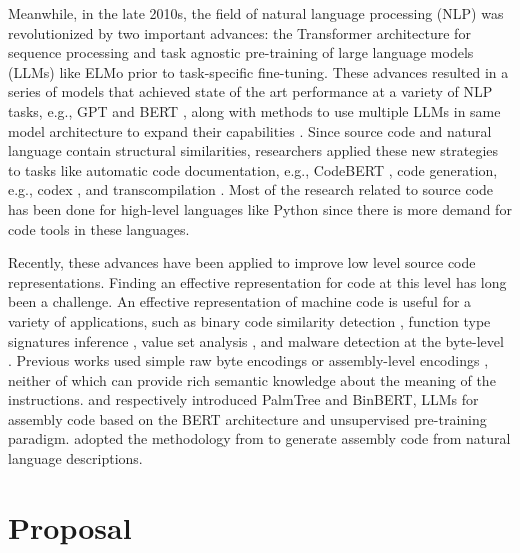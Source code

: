 \documentclass[conference]{IEEEtran}
\begin{document}
Meanwhile, in the late 2010s, the field of natural language processing (NLP) was revolutionized by two important advances: the Transformer architecture for sequence processing \cite{vaswani2017attention} and task agnostic pre-training of large language models (LLMs) like ELMo \cite{peters2018deep} prior to task-specific fine-tuning. These advances resulted in a series of models that achieved state of the art performance at a variety of NLP tasks, e.g., GPT \cite{radford2018improving} and BERT \cite{ devlin2018bert}, along with methods to use multiple LLMs in same model architecture to expand their capabilities \cite{rothe2020leveraging}. Since source code and natural language contain structural similarities, researchers applied these new strategies to tasks like automatic code documentation, e.g., CodeBERT \cite{feng2020codebert}, code generation, e.g., codex \cite{chen2021evaluating}, and transcompilation \cite{roziere2020unsupervised}. Most of the research related to source code has been done for high-level languages like Python since there is more demand for code tools in these languages. 

Recently, these advances have been applied to improve low level source code representations. Finding an effective representation for code at this level has long been a challenge. An effective representation of machine code is useful for a variety of applications, such as binary code similarity detection \cite{xu2017neural}, function type signatures inference \cite{chua2017neural}, value set analysis \cite{guo2019deepvsa}, and malware detection at the byte-level \cite{raff2018malware, raff2021classifying}. Previous works used simple raw byte encodings \cite{guo2019deepvsa} or assembly-level encodings \cite{xu2017neural}, neither of which can provide rich semantic knowledge about the meaning of the instructions. \cite{li2021palmtree} and \cite{artuso2022binbert} respectively introduced PalmTree and BinBERT, LLMs for assembly code based on the BERT \cite{devlin2018bert} architecture and unsupervised pre-training paradigm. \cite{liguori2022can} adopted the methodology from \cite{feng2020codebert} to generate assembly code from natural language descriptions.


\section{Proposal}
\label{sec:Proposal}

\end{document}
